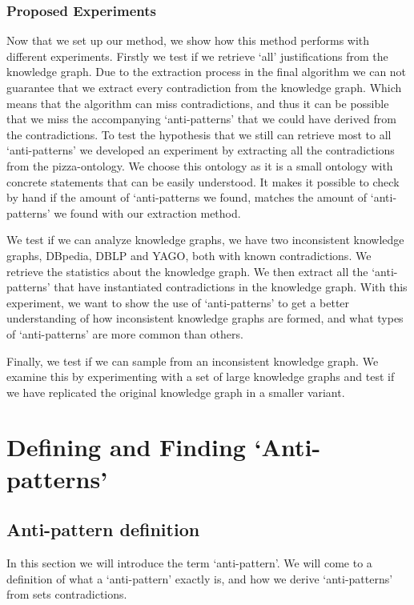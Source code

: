 \documentclass[11pt,letterpaper ,oneside ]{book}
\begin{document}
	\subsection{Proposed Experiments}
	Now that we set up our method, we show how this method performs with different experiments. 
	Firstly we test if we retrieve `all' justifications from the knowledge graph. Due to the extraction process in the final algorithm we can not guarantee that we extract every contradiction from the knowledge graph. Which means that the algorithm can miss contradictions, and thus it can be possible that we miss the accompanying `anti-patterns' that we could have derived from the contradictions. To test the hypothesis that we still can retrieve most to all `anti-patterns' we developed an experiment by extracting all the contradictions from the pizza-ontology. We choose this ontology as it is a small ontology with concrete statements that can be easily understood. It makes it possible to check by hand if the amount of `anti-patterns we found, matches the amount of `anti-patterns' we found with our extraction method.
	
	We test if we can analyze knowledge graphs, we have two inconsistent knowledge graphs, DBpedia, DBLP and YAGO, both with known contradictions. We retrieve the statistics about the knowledge graph. We then extract all the `anti-patterns' that have instantiated contradictions in the knowledge graph. 
	With this experiment, we want to show the use of `anti-patterns' to get a better understanding of how inconsistent knowledge graphs are formed, and what types of `anti-patterns' are more common than others.
	
	Finally, we test if we can sample from an inconsistent knowledge graph. We examine this by experimenting with a set of large knowledge graphs and test if we have replicated the original knowledge graph in a smaller variant.
	
	\newpage
	\chapter{Defining and Finding `Anti-patterns'}\label{Method}
	\section{Anti-pattern definition}\label{AntiPatternDefinition}
	In this section we will introduce the term `anti-pattern'. We will come to a definition of what a `anti-pattern' exactly is, and how we derive `anti-patterns' from sets contradictions. \\
	
\end{document}
